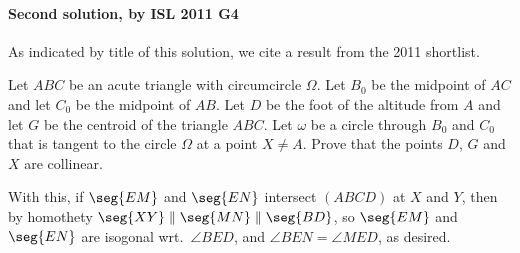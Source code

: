 \paragraph{Second solution, by ISL 2011 G4}     As indicated by title of this solution, we cite a result from the 2011 shortlist.
\begin{lemma*}[ISL 2011 G4]
    Let $ABC$ be an acute triangle with circumcircle $\Omega$. Let $B_0$ be the midpoint of $AC$ and let $C_0$ be the midpoint of $AB$. Let $D$ be the foot of the altitude from $A$ and let $G$ be the centroid of the triangle $ABC$. Let $\omega$ be a circle through $B_0$ and $C_0$ that is tangent to the circle $\Omega$ at a point $X\ne A$. Prove that the points $D$, $G$ and $X$ are collinear.
\end{lemma*}
With this, if $\seg{EM}$ and $\seg{EN}$ intersect $(ABCD)$ at $X$ and $Y$, then by homothety $\seg{XY}\parallel\seg{MN}\parallel\seg{BD}$, so $\seg{EM}$ and $\seg{EN}$ are isogonal wrt.\ $\angle BED$, and $\angle BEN=\angle MED$, as desired.

